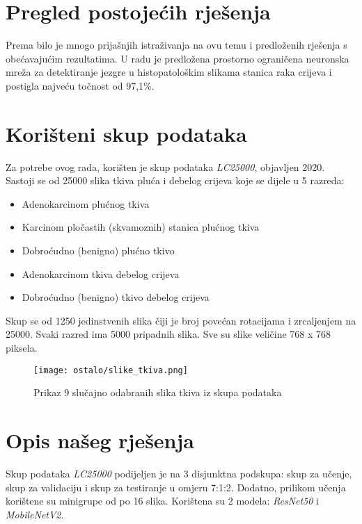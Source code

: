 \documentclass[conference, utf8]{IEEEtran}
\begin{document}
\pagebreak[1]

\section{Pregled postojećih rješenja}
Prema \cite{mehmood2022malignancy} bilo je mnogo prijašnjih istraživanja na ovu temu i predloženih rješenja s obećavajućim rezultatima. U radu \cite{Sirinukunwattana} je predložena prostorno ograničena neuronska mreža za detektiranje jezgre u histopatološkim slikama stanica raka crijeva i postigla najveću točnost od 97,1\%.




\section{Korišteni skup podataka}
Za potrebe ovog rada, korišten je skup podataka \textit{LC25000}, objavljen 2020. \cite{borkowski2019lung} Sastoji se od 25000 slika tkiva pluća i debelog crijeva koje se dijele u 5 razreda:
\begin{itemize}
	\item Adenokarcinom plućnog tkiva
	\item Karcinom pločastih (skvamoznih) stanica plućnog tkiva
	\item Dobroćudno (benigno) plućno tkivo
	\item Adenokarcinom tkiva debelog crijeva
	\item Dobroćudno (benigno) tkivo debelog crijeva
\end{itemize}


Skup se od 1250 jedinstvenih slika čiji je broj povećan rotacijama i zrcaljenjem na 25000. Svaki razred ima 5000 pripadnih slika. Sve su slike veličine 768 x 768 piksela. 

\begin{figure}[ht]
	\centering
	\texttt{[image: ostalo/slike\_tkiva.png]}
	\caption{Prikaz 9 slučajno odabranih slika tkiva iz skupa podataka}
	\label{fig:tissue_images}
\end{figure}


\section{Opis našeg rješenja}
Skup podataka \textit{LC25000} podijeljen je na 3 disjunktna podskupa: skup za učenje, skup za validaciju i skup za testiranje u omjeru 7:1:2. Dodatno, prilikom učenja korištene su minigrupe od po 16 slika. Korištena su 2 modela: \textit{ResNet50} i \textit{MobileNetV2}. 
\end{document}
